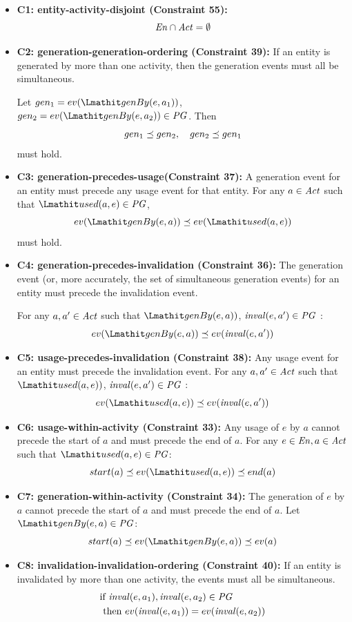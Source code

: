 \begin{itemize}
	
	\item\textbf{C1: entity-activity-disjoint (Constraint 55):} \[\mathit{En} \cap \mathit{Act} = \emptyset\]
	
	\item\textbf{C2: generation-generation-ordering (Constraint 39):}  If an entity is generated by more than one activity, then the generation events must all be simultaneous.
	
	Let 
	$gen_1 = ev(\wgby(e, a_1))$, $gen_2 = ev(\wgby(e, a_2)) \in \pg$. Then  \[gen_1  \preceq  gen_2, \quad gen_2 \preceq gen_1\] must hold.
	
	\item\textbf{C3: generation-precedes-usage(Constraint 37):} A generation event for an entity must precede any usage event for that entity.
	For any $a \in \mathit{Act}$ such that $\used(a,e) \in \pg$, \[	ev(\wgby(e, a)) \preorder ev(\used(a,e))\] must hold.
	
	\item\textbf{C4: generation-precedes-invalidation (Constraint 36):} The generation event (or, more accurately, the set of simultaneous generation events) for an entity must precede the invalidation event.
	
	For any $a,a' \in \mathit{Act}$ such that $\wgby(e, a))$, $\mathit{inval}(e,a') \in \mathit{PG}$ :
	\[ ev(\wgby(e, a)) \preorder ev(\inv(e,a')) \]
	
	\item\textbf{C5: usage-precedes-invalidation (Constraint 38):} Any usage event for an entity must precede the invalidation event.
%	
	For any $a,a' \in \mathit{Act}$ such that $\used(a,e))$, $\mathit{inval}(e,a') \in \mathit{PG}$ :
	\[ ev(\used(a,e)) \preorder ev(\inv(e,a')) \]
	
	\item\textbf{C6: usage-within-activity (Constraint 33):} Any usage of $e$ by $a$ cannot precede the start of $a$ and must precede the end of $a$. For any $e\in \mathit{En}, a \in \mathit{Act}$ such that $\used(a,e) \in \pg$:
	\[start(a) \preorder ev(\used(a,e))   \preorder end(a)\]
	
	\item\textbf{C7: generation-within-activity (Constraint 34):} The generation of $e$ by $a$ cannot precede the start of $a$ and must precede the end of $a$.
	Let $\wgby(e,a) \in \pg$:
	\[ start(a) \preorder ev(\wgby(e,a))  \preorder ev(a)\]
	
	\item\textbf{C8: invalidation-invalidation-ordering (Constraint 40):}	If an entity is invalidated by more than one activity, the events must all be simultaneous.
	\begin{align*}
		&\text{if } \mathit{inval}(e,a_1), \mathit{inval}(e,a_2) \in \mathit{PG} \\
		&\text{ then } ev(\mathit{inval}(e,a_1)) = ev(\mathit{inval}(e,a_2)) 
	\end{align*}


\end{itemize}

